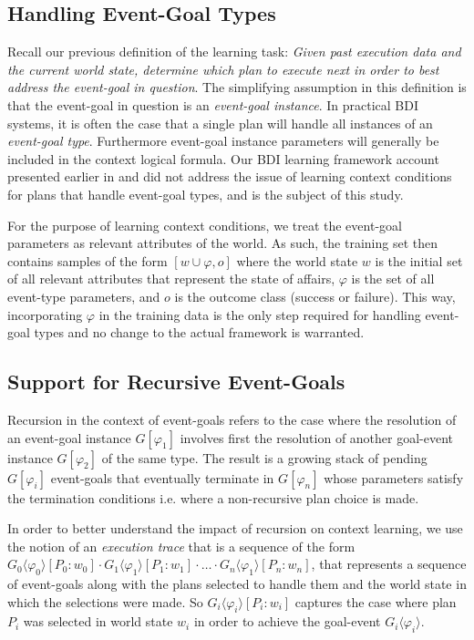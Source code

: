 \subsection{Handling Event-Goal Types}
Recall our previous definition of the learning task: \textit{Given past execution data and the current world state, determine which plan to execute next in order to best address the event-goal in question}. The simplifying assumption in this definition is that the event-goal in question is an \textit{event-goal instance}. In practical BDI systems, it is often the case that a single plan will handle all instances of an \textit{event-goal type}. Furthermore event-goal instance parameters will generally be included in the context logical formula. Our BDI learning framework account presented earlier in \cite{Airiau:IJAT:09} and \cite{Singh:AAMAS10} did not address the issue of learning context conditions for plans that handle event-goal types, and is the subject of this study.

For the purpose of learning context conditions, we treat the event-goal parameters as relevant attributes of the world. As such, the training set then contains samples of the form $[w \cup \varphi,o]$ where the world state $w$ is the initial set of all relevant attributes that represent the state of affairs, $\varphi$ is the set of all event-type parameters, and $o$ is the outcome class (success or failure). This way, incorporating $\varphi$ in the training data is the only step required for handling event-goal types and no change to the actual framework is warranted.

\subsection{Support for Recursive Event-Goals}

Recursion in the context of event-goals refers to the case where the resolution of an event-goal instance $G[\varphi_1]$ involves first the resolution of another goal-event instance $G[\varphi_2]$ of the same type. The result is a growing stack of pending $G[\varphi_i]$ event-goals that eventually terminate in $G[\varphi_n]$ whose parameters satisfy the termination conditions i.e. where a non-recursive plan choice is made.

In order to better understand the impact of recursion on context learning, we use the notion of an \textit{execution trace} that is a sequence of the form $G_0\langle\varphi_0\rangle[P_0:w_0] \cdot G_1\langle\varphi_1\rangle[P_1:w_1] \cdot \ldots \cdot G_n\langle\varphi_1\rangle[P_n:w_n]$, that represents a sequence of event-goals along with the plans selected to handle them and the world state in which the selections were made. So $G_i\langle\varphi_i\rangle[P_i:w_i]$ captures the case where plan $P_i$ was selected in world state $w_i$ in order to achieve the goal-event $G_i\langle\varphi_i\rangle$.

